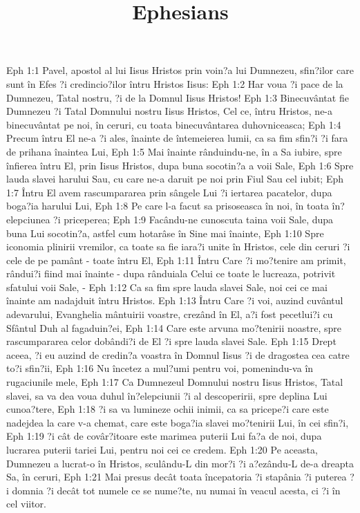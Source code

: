

\title{Ephesians}

Eph 1:1  Pavel, apostol al lui Iisus Hristos prin voin?a lui Dumnezeu, sfin?ilor care sunt în Efes ?i credincio?ilor întru Hristos Iisus:
Eph 1:2  Har voua ?i pace de la Dumnezeu, Tatal nostru, ?i de la Domnul Iisus Hristos!
Eph 1:3  Binecuvântat fie Dumnezeu ?i Tatal Domnului nostru Iisus Hristos, Cel ce, întru Hristos, ne-a binecuvântat pe noi, în ceruri, cu toata binecuvântarea duhovniceasca;
Eph 1:4  Precum întru El ne-a ?i ales, înainte de întemeierea lumii, ca sa fim sfin?i ?i fara de prihana înaintea Lui,
Eph 1:5  Mai înainte rânduindu-ne, în a Sa iubire, spre înfierea întru El, prin Iisus Hristos, dupa buna socotin?a a voii Sale,
Eph 1:6  Spre lauda slavei harului Sau, cu care ne-a daruit pe noi prin Fiul Sau cel iubit;
Eph 1:7  Întru El avem rascumpararea prin sângele Lui ?i iertarea pacatelor, dupa boga?ia harului Lui,
Eph 1:8  Pe care l-a facut sa prisoseasca în noi, în toata în?elepciunea ?i priceperea;
Eph 1:9  Facându-ne cunoscuta taina voii Sale, dupa buna Lui socotin?a, astfel cum hotarâse în Sine mai înainte,
Eph 1:10  Spre iconomia plinirii vremilor, ca toate sa fie iara?i unite în Hristos, cele din ceruri ?i cele de pe pamânt - toate întru El,
Eph 1:11  Întru Care ?i mo?tenire am primit, rândui?i fiind mai înainte - dupa rânduiala Celui ce toate le lucreaza, potrivit sfatului voii Sale, -
Eph 1:12  Ca sa fim spre lauda slavei Sale, noi cei ce mai înainte am nadajduit întru Hristos.
Eph 1:13  Întru Care ?i voi, auzind cuvântul adevarului, Evanghelia mântuirii voastre, crezând în El, a?i fost pecetlui?i cu Sfântul Duh al fagaduin?ei,
Eph 1:14  Care este arvuna mo?tenirii noastre, spre rascumpararea celor dobândi?i de El ?i spre lauda slavei Sale.
Eph 1:15  Drept aceea, ?i eu auzind de credin?a voastra în Domnul Iisus ?i de dragostea cea catre to?i sfin?ii,
Eph 1:16  Nu încetez a mul?umi pentru voi, pomenindu-va în rugaciunile mele,
Eph 1:17  Ca Dumnezeul Domnului nostru Iisus Hristos, Tatal slavei, sa va dea voua duhul în?elepciunii ?i al descoperirii, spre deplina Lui cunoa?tere,
Eph 1:18  ?i sa va lumineze ochii inimii, ca sa pricepe?i care este nadejdea la care v-a chemat, care este boga?ia slavei mo?tenirii Lui, în cei sfin?i,
Eph 1:19  ?i cât de covâr?itoare este marimea puterii Lui fa?a de noi, dupa lucrarea puterii tariei Lui, pentru noi cei ce credem.
Eph 1:20  Pe aceasta, Dumnezeu a lucrat-o în Hristos, sculându-L din mor?i ?i a?ezându-L de-a dreapta Sa, în ceruri,
Eph 1:21  Mai presus decât toata începatoria ?i stapânia ?i puterea ?i domnia ?i decât tot numele ce se nume?te, nu numai în veacul acesta, ci ?i în cel viitor.
